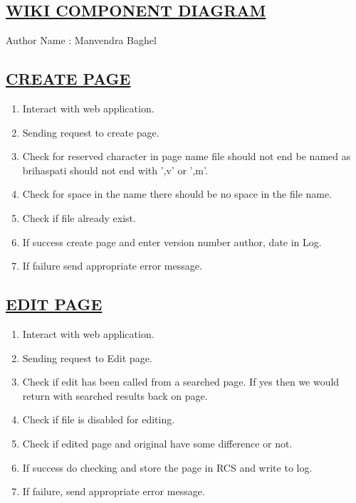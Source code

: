 \documentclass{article}
\begin{document}
              

\begin{center}
\section*{\underline{WIKI COMPONENT DIAGRAM}}
                            
                            Author Name : Manvendra Baghel
\end{center}
\begin{center}

\end{center}
\subsection*{\underline{CREATE PAGE}}
\begin{enumerate}
\item Interact with web application.
\item Sending request to create page.
\item Check for reserved character in page name file should not end be named as brihaspati should not end with ',v' or ',m'.
\item Check for space in the name there should be no space in the file name.
\item Check if file already exist.
\item If success create page and enter version number author, date in Log.
\item If failure send appropriate error message.
\begin{center}

\label{figure:CreatePage_Wiki.latex}
\end{center}
\end{enumerate}
\subsection*{\underline{EDIT PAGE}}
\begin{enumerate}
\item Interact with web application.
\item Sending request to Edit page.
\item Check if edit has been called from a searched page. If yes then we would return with searched results back on page.
\item Check if file is disabled for editing.
\item Check if edited page and original have some difference or not.
\item If success do checking and store the page in RCS and write to log.
\item If failure, send appropriate error message.
\begin{center}

\label{figure:EditPage_Wiki.latex}
\end{center}
\end{enumerate}
\end{document}
